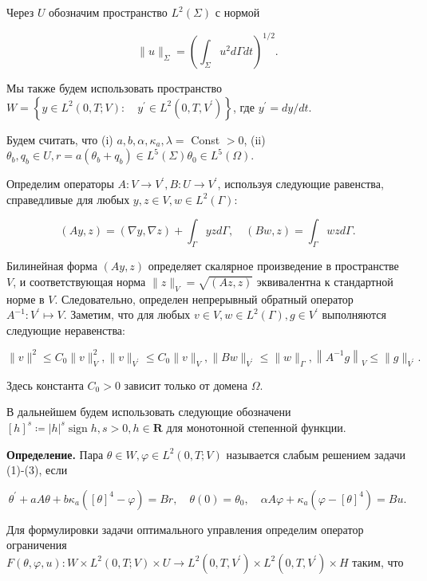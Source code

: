 Через $U$ обозначим пространство $L^{2}(\Sigma)$ с нормой

\[ \|u\|_{\Sigma}=\left(\int_{\Sigma} u^{2} d \Gamma d t\right)^{1 / 2}. \]

Мы также будем использовать пространство
$W=\left\{y \in L^{2}(0, T ; V): \quad y^{\prime}
\in L^{2}\left(0, T, V^{\prime}\right)\right\}$,
где $y^{\prime}=d y / d t$.

Будем считать, что
(i) $a, b, \alpha, \kappa_{a}, \lambda=$ Const $>0$,
(ii) $\theta_{b}, q_{b} \in U, r=a\left(\theta_{b}+q_{b}\right) \in L^{5}(\Sigma) \theta_{0} \in L^{5}(\Omega)$.

Определим операторы $A: V \rightarrow V^{\prime}, B: U \rightarrow V^{\prime}$,
используя следующие равенства, справедливые для любых $y, z \in V, w \in L^{2}(\Gamma)$:

\[
(A y, z)=(\nabla y, \nabla z)+\int_{\Gamma} y z d \Gamma, \quad(B w, z)=\int_{\Gamma} w z d \Gamma.
\]

Билинейная форма $(A y, z)$ определяет скалярное произведение в пространстве $V$,
и соответствующая норма $\|z\|_{V}=\sqrt{(A z, z)}$ эквивалентна к стандартной норме в $V$.
Следовательно, определен непрерывный обратный оператор $A^{-1}: V^{\prime} \mapsto V$.
Заметим, что для любых $v \in V, w \in L^{2}(\Gamma), g \in V^{\prime}$ выполняются следующие неравенства:

\[
\|v\|^{2} \leq C_{0}\|v\|_{V}^{2},\|v\|_{V^{\prime}} \leq C_{0}\|v\|_{V},\|B w\|_{V^{\prime}}
\leq\|w\|_{\Gamma},\left\|A^{-1} g\right\|_{V} \leq\|g\|_{V^{\prime}}.
\]

Здесь константа $C_{0}>0$ зависит только от домена $\Omega$.

В дальнейшем будем использовать следующие обозначени
$[h]^{s} \coloneqq |h|^{s} \operatorname{sign} h, s>0, h \in \mathbf{R}$
для монотонной степенной функции.


\textbf{Определение.}
Пара $\theta \in W, \varphi \in L^{2}(0, T ; V)$ называется слабым решением задачи (1)-(3), если

\[
\theta^{\prime}+a A \theta+b \kappa_{a}\left([\theta]^{4}-\varphi\right)=B r,
\quad \theta(0)=\theta_{0}, \quad \alpha A \varphi+\kappa_{a}\left(\varphi-[\theta]^{4}\right)=B u.
\]

Для формулировки задачи оптимального управления определим оператор ограничения
$F(\theta, \varphi, u): W \times L^{2}(0, T; V) \times U
\rightarrow L^{2} \left(0, T, V^{\prime}\right)
\times L^{2}\left(0, T, V^{\prime}\right) \times H$ таким, что

